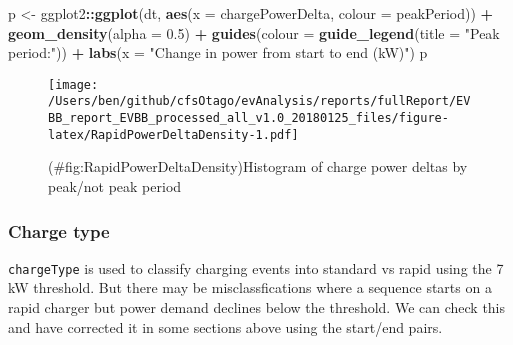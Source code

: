 \documentclass[]{article}
\newenvironment{Shaded}{\begin{snugshade}}{\end{snugshade}}
\newcommand{\CommentTok}[1]{\textcolor[rgb]{0.56,0.35,0.01}{\textit{#1}}}
\newcommand{\DataTypeTok}[1]{\textcolor[rgb]{0.13,0.29,0.53}{#1}}
\newcommand{\FloatTok}[1]{\textcolor[rgb]{0.00,0.00,0.81}{#1}}
\newcommand{\KeywordTok}[1]{\textcolor[rgb]{0.13,0.29,0.53}{\textbf{#1}}}
\newcommand{\NormalTok}[1]{#1}
\newcommand{\OperatorTok}[1]{\textcolor[rgb]{0.81,0.36,0.00}{\textbf{#1}}}
\newcommand{\StringTok}[1]{\textcolor[rgb]{0.31,0.60,0.02}{#1}}
\begin{document}
\begin{Shaded}
\begin{Highlighting}[]
\NormalTok{p <-}\StringTok{ }\NormalTok{ggplot2}\OperatorTok{::}\KeywordTok{ggplot}\NormalTok{(dt, }\KeywordTok{aes}\NormalTok{(}\DataTypeTok{x =}\NormalTok{ chargePowerDelta, }\DataTypeTok{colour =}\NormalTok{ peakPeriod)) }\OperatorTok{+}
\StringTok{  }\KeywordTok{geom_density}\NormalTok{(}\DataTypeTok{alpha =} \FloatTok{0.5}\NormalTok{) }\OperatorTok{+}
\StringTok{  }\KeywordTok{guides}\NormalTok{(}\DataTypeTok{colour =} \KeywordTok{guide_legend}\NormalTok{(}\DataTypeTok{title =} \StringTok{"Peak period:"}\NormalTok{)) }\OperatorTok{+}
\StringTok{  }\KeywordTok{labs}\NormalTok{(}\DataTypeTok{x =} \StringTok{"Change in power from start to end (kW)"}\NormalTok{)}
\NormalTok{p}
\end{Highlighting}
\end{Shaded}

\begin{figure}
\centering
\texttt{[image: /Users/ben/github/cfsOtago/evAnalysis/reports/fullReport/EVBB\_report\_EVBB\_processed\_all\_v1.0\_20180125\_files/figure-latex/RapidPowerDeltaDensity-1.pdf]}
\caption{(\#fig:RapidPowerDeltaDensity)Histogram of charge power deltas by peak/not peak period}
\end{figure}

\hypertarget{charge-type}{%
\subsubsection{Charge type}\label{charge-type}}

\texttt{chargeType} is used to classify charging events into standard vs rapid using the 7 kW threshold. But there may be misclassfications where a sequence starts on a rapid charger but power demand declines below the threshold. We can check this and have corrected it in some sections above using the start/end pairs.

\begin{Shaded}
\end{Shaded}
\end{document}
